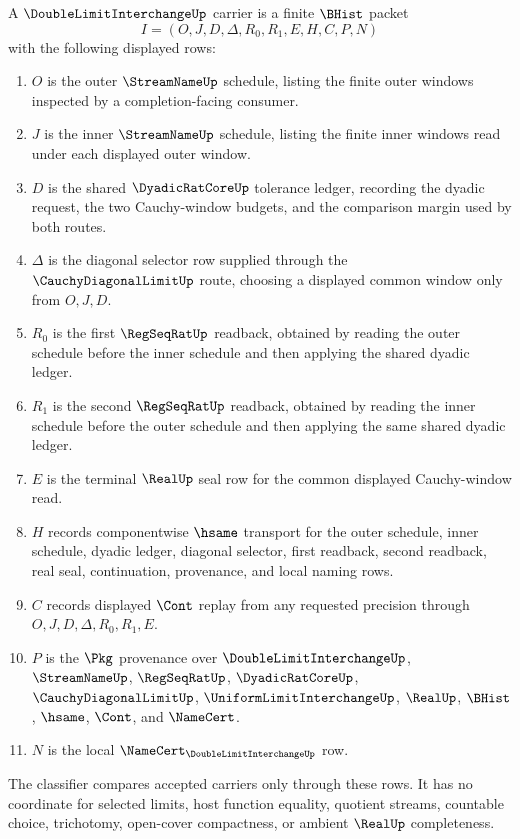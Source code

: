 \begin{definition}
\label{def:double-limit-interchange-carrier}
A $\DoubleLimitInterchangeUp$ carrier is a finite $\BHist$ packet
$$
I=(O,J,D,\Delta,R_0,R_1,E,H,C,P,N)
$$
with the following displayed rows:
\begin{enumerate}
\item $O$ is the outer $\StreamNameUp$ schedule, listing the finite outer windows inspected by a completion-facing consumer.
\item $J$ is the inner $\StreamNameUp$ schedule, listing the finite inner windows read under each displayed outer window.
\item $D$ is the shared $\DyadicRatCoreUp$ tolerance ledger, recording the dyadic request, the two Cauchy-window budgets, and the comparison margin used by both routes.
\item $\Delta$ is the diagonal selector row supplied through the $\CauchyDiagonalLimitUp$ route, choosing a displayed common window only from $O,J,D$.
\item $R_0$ is the first $\RegSeqRatUp$ readback, obtained by reading the outer schedule before the inner schedule and then applying the shared dyadic ledger.
\item $R_1$ is the second $\RegSeqRatUp$ readback, obtained by reading the inner schedule before the outer schedule and then applying the same shared dyadic ledger.
\item $E$ is the terminal $\RealUp$ seal row for the common displayed Cauchy-window read.
\item $H$ records componentwise $\hsame$ transport for the outer schedule, inner schedule, dyadic ledger, diagonal selector, first readback, second readback, real seal, continuation, provenance, and local naming rows.
\item $C$ records displayed $\Cont$ replay from any requested precision through $O,J,D,\Delta,R_0,R_1,E$.
\item $P$ is the $\Pkg$ provenance over $\DoubleLimitInterchangeUp$, $\StreamNameUp$, $\RegSeqRatUp$, $\DyadicRatCoreUp$, $\CauchyDiagonalLimitUp$, $\UniformLimitInterchangeUp$, $\RealUp$, $\BHist$, $\hsame$, $\Cont$, and $\NameCert$.
\item $N$ is the local $\NameCert_{\DoubleLimitInterchangeUp}$ row.
\end{enumerate}
The classifier compares accepted carriers only through these rows. It has no coordinate for selected limits, host function equality, quotient streams, countable choice, trichotomy, open-cover compactness, or ambient $\RealUp$ completeness.
\end{definition}

